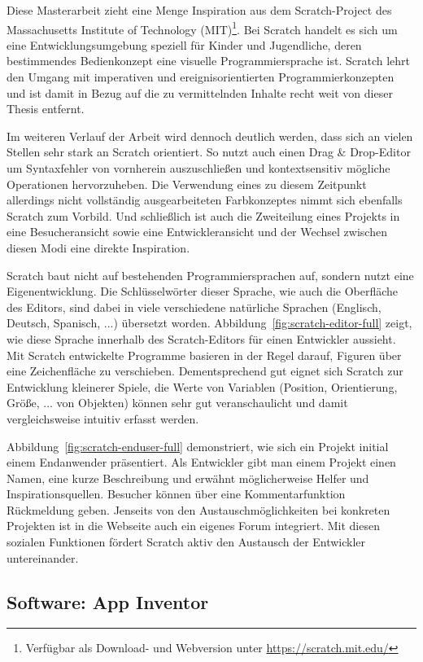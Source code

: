 Diese Masterarbeit zieht eine Menge Inspiration aus dem Scratch-Project des Massachusetts Institute of Technology (MIT)\footnote{Verfügbar als Download- und Webversion unter \url{https://scratch.mit.edu/}}. Bei Scratch handelt es sich um eine Entwicklungsumgebung speziell für Kinder und Jugendliche, deren bestimmendes Bedienkonzept eine visuelle Programmiersprache ist. Scratch lehrt den Umgang mit imperativen und ereignisorientierten Programmierkonzepten und ist damit in Bezug auf die zu vermittelnden Inhalte recht weit von dieser Thesis entfernt.

Im weiteren Verlauf der Arbeit wird dennoch deutlich werden, dass sich \idename{} an vielen Stellen sehr stark an Scratch orientiert. So nutzt auch \idename{} einen Drag \& Drop-Editor um Syntaxfehler von vornherein auszuschließen und kontextsensitiv mögliche Operationen hervorzuheben. Die Verwendung eines zu diesem Zeitpunkt allerdings nicht vollständig ausgearbeiteten Farbkonzeptes nimmt sich ebenfalls Scratch zum Vorbild. Und schließlich ist auch die Zweiteilung eines Projekts in eine Besucheransicht sowie eine Entwickleransicht und der Wechsel zwischen diesen Modi eine direkte Inspiration.

Scratch baut nicht auf bestehenden Programmiersprachen auf, sondern nutzt eine Eigenentwicklung. Die Schlüsselwörter dieser Sprache, wie auch die Oberfläche des Editors, sind dabei in viele verschiedene natürliche Sprachen (Englisch, Deutsch, Spanisch, ...) übersetzt worden. Abbildung~\ref{fig:scratch-editor-full} zeigt, wie diese Sprache innerhalb des Scratch-Editors für einen Entwickler aussieht. Mit Scratch entwickelte Programme basieren in der Regel darauf, Figuren über eine Zeichenfläche zu verschieben. Dementsprechend gut eignet sich Scratch zur Entwicklung kleinerer Spiele, die Werte von Variablen (Position, Orientierung, Größe, ... von Objekten) können sehr gut veranschaulicht und damit vergleichsweise intuitiv erfasst werden.

Abbildung~\ref{fig:scratch-enduser-full} demonstriert, wie sich ein Projekt initial einem Endanwender präsentiert. Als Entwickler gibt man einem Projekt einen Namen, eine kurze Beschreibung und erwähnt möglicherweise Helfer und Inspirationsquellen. Besucher können über eine Kommentarfunktion Rückmeldung geben. Jenseits von den Austauschmöglichkeiten bei konkreten Projekten ist in die Webseite auch ein eigenes Forum integriert. Mit diesen sozialen Funktionen fördert Scratch aktiv den Austausch der Entwickler untereinander.

\subsection{Software: App Inventor}
\label{sec:related-app-inventor}

